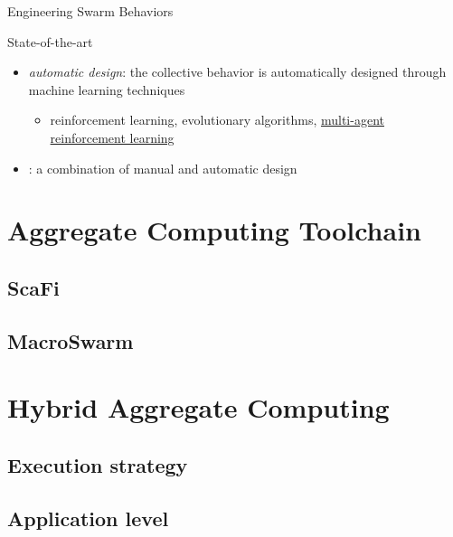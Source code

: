 \documentclass[presentation, 9pt]{beamer}\mode<presentation>{\usetheme{AMSBolognaFC}}
\begin{document}
\begin{frame}[allowframebreaks]{Engineering Swarm Behaviors}
\begin{block}{State-of-the-art}
\begin{itemize}
\begin{itemize}
			\end{itemize}
			\item \emph{automatic design}: the collective behavior is automatically designed through machine learning techniques
			\begin{itemize}
				\item reinforcement learning, evolutionary algorithms, \underline{multi-agent reinforcement learning}
			\end{itemize}
			\item \emph{}: a combination of manual and automatic design
		\end{itemize}
	\end{block}
\end{frame}
\section{Aggregate Computing Toolchain}
\subsection{ScaFi}
\subsection{MacroSwarm}
\section{Hybrid Aggregate Computing}
\subsection{Execution strategy}
\subsection{Application level}
\end{document}
